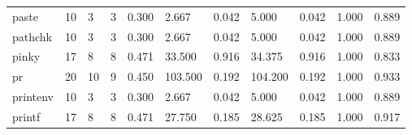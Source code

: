 \begin{longtable}{lp{1.8cm}p{1.8cm}p{1.8cm}p{1.8cm}p{1.8cm}p{1.8cm}p{1.8cm}p{1.8cm}p{1.8cm}p{1.8cm}}
paste     &                           10 &                  3 &                                 3 &                                      0.300 &                                  2.667 &                                        0.042 &                             5.000 &                                   0.042 &                              1.000 &                                              0.889 \\
pathchk   &                           10 &                  3 &                                 3 &                                      0.300 &                                  2.667 &                                        0.042 &                             5.000 &                                   0.042 &                              1.000 &                                              0.889 \\
pinky     &                           17 &                  8 &                                 8 &                                      0.471 &                                 33.500 &                                        0.916 &                            34.375 &                                   0.916 &                              1.000 &                                              0.833 \\
pr        &                           20 &                 10 &                                 9 &                                      0.450 &                                103.500 &                                        0.192 &                           104.200 &                                   0.192 &                              1.000 &                                              0.933 \\
printenv  &                           10 &                  3 &                                 3 &                                      0.300 &                                  2.667 &                                        0.042 &                             5.000 &                                   0.042 &                              1.000 &                                              0.889 \\
printf    &                           17 &                  8 &                                 8 &                                      0.471 &                                 27.750 &                                        0.185 &                            28.625 &                                   0.185 &                              1.000 &                                              0.917 \\

\end{longtable}
